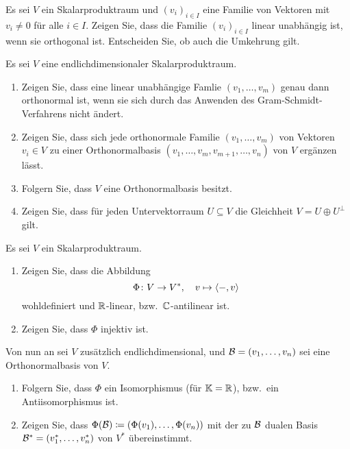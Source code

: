 \documentclass[a4paper, 10pt]{scrartcl}
\begin{document}
\begin{question}
  Es sei $V$ ein Skalarproduktraum und $(v_i)_{i \in I}$ eine Familie von Vektoren mit $v_i \neq 0$ für alle $i \in I$.
  Zeigen Sie, dass die Familie $(v_i)_{i \in I}$ linear unabhängig ist, wenn sie orthogonal ist.
  Entscheiden Sie, ob auch die Umkehrung gilt.
\end{question}


\begin{question}
  Es sei $V$ eine endlichdimensionaler Skalarproduktraum.
  \begin{enumerate}[leftmargin=*]
    \item
      Zeigen Sie, dass eine linear unabhängige Famlie $(v_1, \dotsc, v_m)$ genau dann orthonormal ist, wenn sie sich durch das Anwenden des Gram-Schmidt-Verfahrens nicht ändert.
    \item
      Zeigen Sie, dass sich jede orthonormale Familie $(v_1, \dotsc, v_m)$ von Vektoren $v_i \in V$ zu einer Orthonormalbasis $(v_1, \dotsc, v_m, v_{m+1}, \dotsc, v_n)$ von $V$ ergänzen lässt.
    \item
      Folgern Sie, dass $V$ eine Orthonormalbasis besitzt.
    \item
      Zeigen Sie, dass für jeden Untervektorraum $U \subseteq V$ die Gleichheit $V = U \oplus U^\perp$ gilt.
  \end{enumerate}
\end{question}


\begin{question}
  Es sei $V$ ein Skalarproduktraum.
  \begin{enumerate}[leftmargin=*]
    \item
      Zeigen Sie, dass die Abbildung
      \[
        \Phi \colon V \to V^*,
        \quad
        v \mapsto \left\langle -, v \right\rangle
      \]
      wohldefiniert und $\mathbb{R}$-linear, bzw.\ $\mathbb{C}$-antilinear ist.
    \item
      Zeigen Sie, dass $\Phi$ injektiv ist.
  \end{enumerate}
  Von nun an sei $V$ zusätzlich endlichdimensional, und $\mathcal{B} = (v_1, \dotsc, v_n)$ sei eine Orthonormalbasis von $V$.
  \begin{enumerate}[leftmargin=*, resume]
    \item
      Folgern Sie, dass $\Phi$ ein Isomorphismus (für $\mathbb{K} = \mathbb{R}$), bzw.\ ein Antiisomorphismus ist.
    \item
      Zeigen Sie, dass $\Phi(\mathcal{B}) \coloneqq (\Phi(v_1), \dotsc, \Phi(v_n))$ mit der zu $\mathcal{B}$ dualen Basis $\mathcal{B}^* = (v_1^*, \dotsc, v_n^*)$ von $V^*$ übereinstimmt.
  \end{enumerate}
\end{question}
\end{document}
